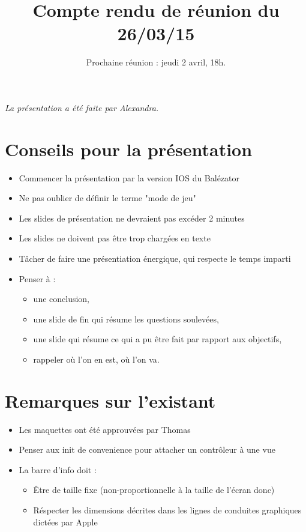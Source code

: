 \documentclass{scrartcl}
\begin{document}

\title{Compte rendu de réunion du 26/03/15}
\subtitle{Prochaine réunion : jeudi 2 avril, 18h.\vspace{-5ex}}
\date{}
\maketitle

\textit{La présentation a été faite par Alexandra.}

\section{Conseils pour la présentation}
\begin{itemize}
	\item Commencer la présentation par la version IOS du Balézator
	\item Ne pas oublier de définir le terme "mode de jeu"
	\item Les slides de présentation ne devraient pas excéder 2 minutes
	\item Les slides ne doivent pas être trop chargées en texte
	\item Tâcher de faire une présentiation énergique, qui respecte le temps imparti
	\item Penser à :
		\begin{itemize}
			\item une conclusion, 
			\item une slide de fin qui résume les questions soulevées,
			\item une slide qui résume ce qui a pu être fait par rapport aux objectifs,
			\item rappeler où l'on en est, où l'on va.
		\end{itemize}
\end{itemize}

\section{Remarques sur l'existant}
\begin{itemize}
	\item Les maquettes ont été approuvées par Thomas
	\item Penser aux init de convenience pour attacher un contrôleur à une vue
	\item La barre d'info doit :
		\begin{itemize}
			\item Être de taille fixe (non-proportionnelle à la taille de l'écran donc)
			\item Réspecter les dimensions décrites dans les lignes de conduites graphiques dictées par Apple
		\end{itemize}
\end{itemize}
\end{document}

